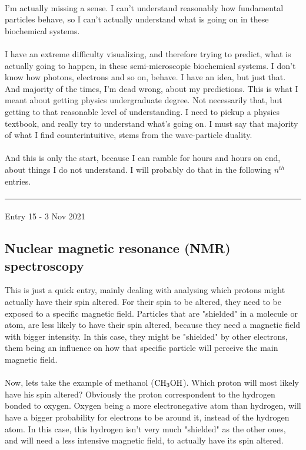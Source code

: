 \documentclass[12pt,  letterpaper]{article}
\begin{document}
\paragraph*{}
I'm actually missing a sense. I can't understand reasonably how fundamental particles behave, so I can't actually understand what is going on in these biochemical systems.
\paragraph*{}
I have an extreme difficulty visualizing, and therefore trying to predict, what is actually going to happen, in these semi-microscopic biochemical systems. I don't know how photons, electrons and so on, behave. I have an idea, but just that. And majority of the times, I'm dead wrong, about my predictions. This is what I meant about getting physics undergraduate degree. Not necessarily that, but getting to that reasonable level of understanding. I need to pickup a physics textbook, and really try to understand what's going on. I must say that majority of what I find counterintuitive, stems from the wave-particle duality.
\paragraph*{}
And this is only the start, because I can ramble for hours and hours on end, about things I do not understand. I will probably do that in the following $n^{th}$ entries.
\paragraph*{}
\hrule
\paragraph*{}
Entry 15 - 3 Nov 2021
\subsection*{Nuclear magnetic resonance (NMR) spectroscopy}
This is just a quick entry, mainly dealing with analysing which protons might actually have their spin altered. For their spin to be altered, they need to be exposed to a specific magnetic field. Particles that are "shielded" in a molecule or atom, are less likely to have their spin altered, because they need a magnetic field with bigger intensity. In this case, they might be "shielded" by other electrons, them being an influence on how that specific particle will perceive the main magnetic field.\paragraph*{}
Now, lets take the example of methanol ($\ce{CH3OH}$). Which proton will most likely have his spin altered? Obviously the proton correspondent to the hydrogen bonded to oxygen. Oxygen being a more electronegative atom than hydrogen, will have a bigger probability for electrons to be around it, instead of the hydrogen atom. In this case, this hydrogen isn't very much "shielded" as the other ones, and will need a less intensive magnetic field, to actually have its spin altered.
\end{document}
